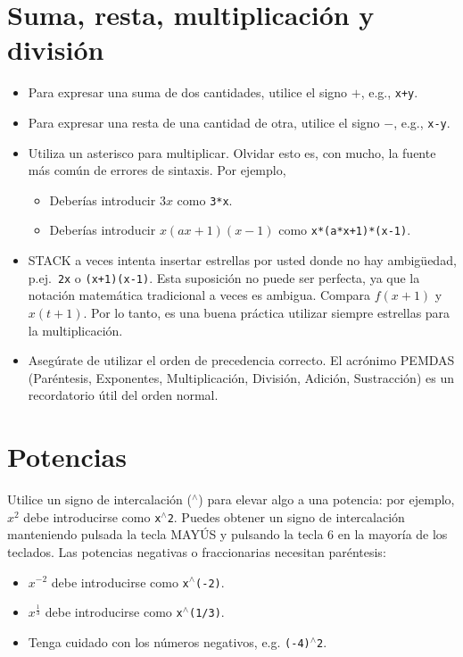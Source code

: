 \documentclass[a4paper]{article}
\newcommand{\stack}[1]{{\color{red}\tt #1}}
\begin{document}
\begin{multicols}{2}
\section*{Suma, resta, multiplicación y división}
\begin{itemize}
\item Para expresar una suma de dos cantidades, utilice el signo $+$, e.g., \stack{x+y}.
\item Para expresar una resta de una cantidad de otra, utilice el signo $-$, e.g., \stack{x-y}.
\item Utiliza un asterisco para multiplicar. Olvidar esto es, con mucho, la fuente más común de errores de sintaxis. Por ejemplo,
\begin{itemize}
\item Deberías introducir $3x$ como \stack{3*x}.
\item Deberías introducir $x(ax+1)(x-1)$ como \stack{x*(a*x+1)*(x-1)}.
\end{itemize}
\item STACK a veces intenta insertar estrellas por usted donde no hay ambigüedad, p.ej.~\stack{2x} o \stack{(x+1)(x-1)}. Esta suposición no puede ser perfecta, ya que la notación matemática tradicional a veces es ambigua. Compara $f(x+1)$ y $x(t+1)$. Por lo tanto, es una buena práctica utilizar siempre estrellas para la multiplicación.
\item Asegúrate de utilizar el orden de precedencia correcto. El acrónimo PEMDAS (Paréntesis, Exponentes, Multiplicación, División, Adición, Sustracción) es un recordatorio útil del orden normal.
\end{itemize}

\section*{Potencias}
Utilice un signo de intercalación ($^{\wedge}$) para elevar algo a una potencia: por ejemplo, $x^2$ debe introducirse como \stack{x$^{\wedge}$2}. Puedes obtener un signo de intercalación manteniendo pulsada la tecla MAYÚS y pulsando la tecla 6 en la mayoría de los teclados. Las potencias negativas o fraccionarias necesitan paréntesis:
\begin{itemize}
\item $x^{-2}$ debe introducirse como \stack{x$^{\wedge}$(-2)}.
\item $x^{\frac{1}{3}}$ debe introducirse como \stack{x$^{\wedge}$(1/3)}.
\item Tenga cuidado con los números negativos, e.g. \stack{(-4)$^{\wedge}$2}.
\end{itemize}


\end{multicols}
\end{document}
